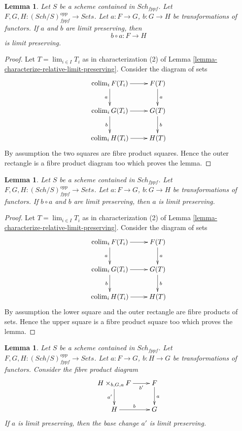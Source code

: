 \documentclass{stacks-project}
\theoremstyle{plain}
\newtheorem{lemma}[subsection]{Lemma}
\theoremstyle{definition}
\theoremstyle{remark}
\numberwithin{equation}{subsection}
\def\lim{\mathop{\mathrm{lim}}\nolimits}
\def\colim{\mathop{\mathrm{colim}}\nolimits}
\def\Sch{\mathit{Sch}}
\begin{document}
\begin{lemma}
\label{lemma-composition-locally-finite-presentation}
Let $S$ be a scheme contained in $\Sch_{fppf}$.
Let $F, G, H : (\Sch/S)_{fppf}^{opp} \to \textit{Sets}$.
Let $a : F \to G$, $b : G \to H$ be transformations of functors.
If $a$ and $b$ are limit preserving, then
$$
b \circ a : F \longrightarrow H
$$
is limit preserving.
\end{lemma}

\begin{proof}
Let $T = \lim_{i \in I} T_i$ as in characterization (2) of
Lemma \ref{lemma-characterize-relative-limit-preserving}.
Consider the diagram of sets
$$
\xymatrix{
\colim_i F(T_i) \ar[r] \ar[d]_a & F(T) \ar[d]^a \\
\colim_i G(T_i) \ar[r] \ar[d]_b & G(T) \ar[d]^b \\
\colim_i H(T_i) \ar[r] & H(T)
}
$$
By assumption the two squares are fibre product squares. Hence the
outer rectangle is a fibre product diagram too which proves the lemma.
\end{proof}

\begin{lemma}
\label{lemma-locally-finite-presentation-permanence}
Let $S$ be a scheme contained in $\Sch_{fppf}$.
Let $F, G, H : (\Sch/S)_{fppf}^{opp} \to \textit{Sets}$.
Let $a : F \to G$, $b : G \to H$ be transformations of functors.
If $b \circ a$ and $b$ are limit preserving, then $a$
is limit preserving.
\end{lemma}

\begin{proof}
Let $T = \lim_{i \in I} T_i$ as in characterization (2) of
Lemma \ref{lemma-characterize-relative-limit-preserving}.
Consider the diagram of sets
$$
\xymatrix{
\colim_i F(T_i) \ar[r] \ar[d]_a & F(T) \ar[d]^a \\
\colim_i G(T_i) \ar[r] \ar[d]_b & G(T) \ar[d]^b \\
\colim_i H(T_i) \ar[r] & H(T)
}
$$
By assumption the lower square and the outer rectangle
are fibre products of sets. Hence the upper square
is a fibre product square too which proves the lemma.
\end{proof}

\begin{lemma}
\label{lemma-base-change-locally-finite-presentation}
Let $S$ be a scheme contained in $\Sch_{fppf}$.
Let $F, G, H : (\Sch/S)_{fppf}^{opp} \to \textit{Sets}$.
Let $a : F \to G$, $b : H \to G$ be transformations of functors.
Consider the fibre product diagram
$$
\xymatrix{
H \times_{b, G, a} F \ar[r]_-{b'} \ar[d]_{a'} & F \ar[d]^a \\
H \ar[r]^b & G
}
$$
If $a$ is limit preserving, then the base change $a'$ is limit preserving.
\end{lemma}
\end{document}
